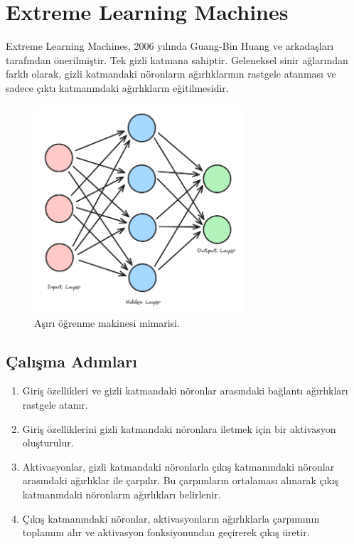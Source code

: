 
\section{Extreme Learning Machines}
Extreme Learning Machines, 2006 yılında Guang-Bin Huang ve arkadaşları tarafından önerilmiştir. Tek gizli katmana sahiptir. Geleneksel sinir ağlarından farklı olarak, gizli katmandaki nöronların ağırlıklarının rastgele atanması ve sadece çıktı katmanındaki ağırlıkların eğitilmesidir.

\begin{figure}[h]
    \centering
    \includegraphics[width=0.7\textwidth]{images/extreme_learning_machine.png}
    \caption{Aşırı öğrenme makinesi mimarisi.}
    \label{fig:enter-label}
\end{figure}

\subsection{Çalışma Adımları}
\begin{enumerate}
    \item Giriş özellikleri ve gizli katmandaki nöronlar arasındaki bağlantı ağırlıkları rastgele atanır.
    \item Giriş özelliklerini gizli katmandaki nöronlara iletmek için bir aktivasyon oluşturulur.
    \item Aktivasyonlar, gizli katmandaki nöronlarla çıkış katmanındaki nöronlar arasındaki ağırlıklar ile çarpılır. Bu çarpımların ortalaması alınarak çıkış katmanındaki nöronların ağırlıkları belirlenir.
    \item Çıkış katmanındaki nöronlar, aktivasyonların ağırlıklarla çarpımının toplamını alır ve aktivasyon fonksiyonundan geçirerek çıkış üretir.
\end{enumerate}

\newpage